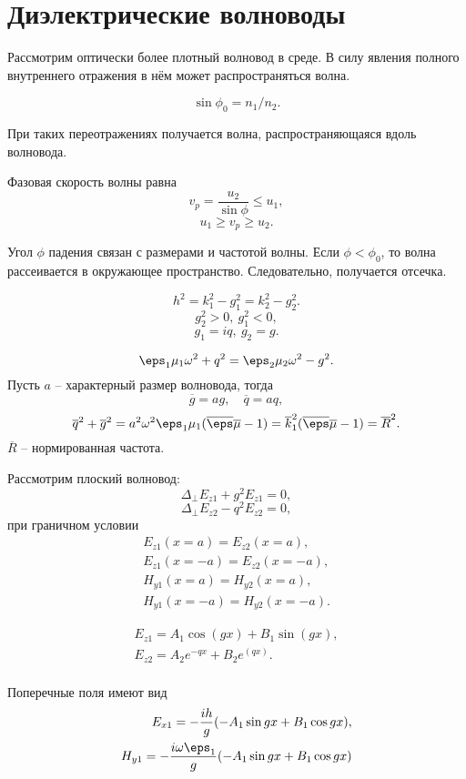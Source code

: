 \chapter{Диэлектрические волноводы}

Рассмотрим оптически более плотный волновод в среде. В силу явления полного внутреннего отражения в нём может распространяться волна.

\[
	\sin\phi_0 = n_1 / n_2.
\]

При таких переотражениях получается волна, распространяющаяся вдоль волновода.

Фазовая скорость волны равна
\[
	v_p = \frac{u_2}{\sin\phi} \le u_1,
\]
\[
	u_1 \ge v_p \ge u_2.
\]

Угол \( \phi \) падения связан с размерами и частотой волны. Если \( \phi < \phi_0 \), то волна рассеивается в окружающее пространство. Следовательно, получается отсечка.

\[
	h^2 = k_1^2 - g_1^2 = k_2^2 - g_2^2.
\]
\[
	g_2^2 > 0,\ g_1^2 < 0,
\]
\[
	g_1 = iq,\ g_2 = g.
\]

\[
	\eps_1\mu_1\omega^2 + q^2 = \eps_2\mu_2\omega^2 - g^2.
\]
Пусть \( a \) -- характерный размер волновода, тогда
\[
	\overline{g} = ag,\quad \overline{q} = aq,
\]
\[
	\overline{q}^2 + \overline{g}^2 = a^2\omega^2\eps_1\mu_1(\overline{\eps}\overline{\mu} - 1) = \overline{k}_1^2(\overline{\eps}\overline{\mu} - 1) = \overline{R}^2.
\]
\(\overline{R}\) -- нормированная частота.

Рассмотрим плоский волновод:
\[
	\Delta_\perp E_{z1} + g^2 E_{z1} = 0,
\]
\[
	\Delta_\perp E_{z2} - q^2 E_{z2} = 0,
\]
при граничном условии
\begin{align*}
	E_{z1}(x=a) = E_{z2}(x=a),\\
	E_{z1}(x=-a) = E_{z2}(x=-a),\\
	H_{y1}(x=a) = H_{y2}(x=a),\\
	H_{y1}(x=-a) = H_{y2}(x=-a).
\end{align*}

\begin{align*}
	E_{z1} = A_1\cos(gx) + B_1\sin(gx),\\
	E_{z2} = A_2 e^{-qx} + B_2 e^(qx).\\
\end{align*}

Поперечные поля имеют вид
\begin{align*}
	E_{x1} = -\frac{ih}{g}(-A_1\sin gx + B_1\cos gx),\\
	H_{y1} = -\frac{i\omega\eps_1}{g}(-A_1\sin gx + B_1\cos gx)\\
\end{align*}


